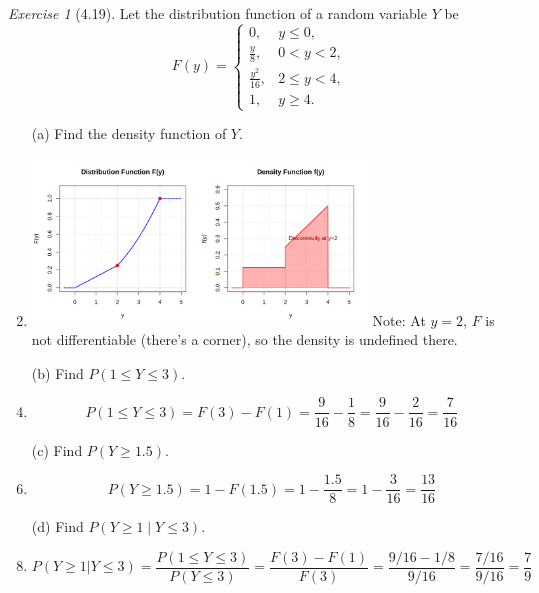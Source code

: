 \documentclass[12pt]{amsart}
\makeatletter
\theoremstyle{remark}
\newtheorem*{exercise}{Exercise}%
\renewenvironment{proof}[1][\proofname]{\par\doublespacing
  \pushQED{\qed}%
  \normalfont \topsep6\p@\@plus6\p@\relax
  \list{}{%
    \settowidth{\leftmargin}{\itshape\proofname:\hskip\labelsep}%
    \setlength{\labelwidth}{0pt}%
    \setlength{\itemindent}{-\leftmargin}%
  }%
  \item[\hskip\labelsep\itshape#1\@addpunct{:}]\ignorespaces
}{%
  \popQED\endlist\@endpefalse
  \singlespacing
}
\theoremstyle{mycomment}
\makeatother
\begin{document}
\begin{exercise}[4.19]
Let the distribution function of a random variable $Y$ be
$$F(y) = \begin{cases}
0, & y \leq 0, \\
\frac{y}{8}, & 0 < y < 2, \\
\frac{y^2}{16}, & 2 \leq y < 4, \\
1, & y \geq 4.
\end{cases}$$

\begin{enumerate}
    \item[(a)] Find the density function of $Y$.
\begin{proof}[Solution]
	\includegraphics[width=0.7\textwidth]{exercise_4_19.png}
  	Note: At $y = 2$, $F$ is not differentiable (there's a corner), so the density is undefined there.
\end{proof}
    \item[(b)] Find $P(1 \leq Y \leq 3)$.
\begin{proof}[Solution]
 	$$P(1 \leq Y \leq 3) = F(3) - F(1) = \frac{9}{16} - \frac{1}{8} = \frac{9}{16} - \frac{2}{16} = \frac{7}{16}$$
\end{proof}
    \item[(c)] Find $P(Y \geq 1.5)$.
\begin{proof}[Solution]
 	$$P(Y \geq 1.5) = 1 - F(1.5) = 1 - \frac{1.5}{8} = 1 - \frac{3}{16} = \frac{13}{16}$$
\end{proof}
    \item[(d)] Find $P(Y \geq 1 \mid Y \leq 3)$.
\begin{proof}[Solution]
 	$$P(Y \geq 1 | Y \leq 3) = \frac{P(1 \leq Y \leq 3)}{P(Y \leq 3)} = \frac{F(3) - F(1)}{F(3)} = \frac{9/16 - 1/8}{9/16} = \frac{7/16}{9/16} = \frac{7}{9}$$
\end{proof}
\end{enumerate} 
\end{exercise}

 
\end{document}
